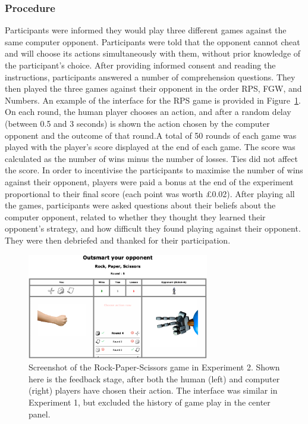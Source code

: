 \documentclass[
  english,
  man,floatsintext]{apa6}
\begin{document}
\hypertarget{procedure}{%
\subsubsection{Procedure}\label{procedure}}

Participants were informed they would play three different games against the same computer opponent. Participants were told that the opponent cannot cheat and will choose its actions simultaneously with them, without prior knowledge of the participant's choice. After providing informed consent and reading the instructions, participants answered a number of comprehension questions. They then played the three games against their opponent in the order RPS, FGW, and Numbers. An example of the interface for the RPS game is provided in Figure~\ref{fig:feedback-rps-exp2}. On each round, the human player chooses an action, and after a random delay (between 0.5 and 3 seconds) is shown the action chosen by the computer opponent and the outcome of that round.A total of 50 rounds of each game was played with the player's score displayed at the end of each game. The score was calculated as the number of wins minus the number of losses. Ties did not affect the score. In order to incentivise the participants to maximise the number of wins against their opponent, players were paid a bonus at the end of the experiment proportional to their final score (each point was worth £0.02). After playing all the games, participants were asked questions about their beliefs about the computer opponent, related to whether they thought they learned their opponent's strategy, and how difficult they found playing against their opponent. They were then debriefed and thanked for their participation.

\begin{figure}

{\centering \includegraphics[width=3.13in]{images/feedback_rps} 

}

\caption{Screenshot of the Rock-Paper-Scissors game in Experiment 2. Shown here is the feedback stage, after both the human (left) and computer (right) players have chosen their action. The interface was similar in Experiment 1, but excluded the history of game play in the center panel.}\label{fig:feedback-rps-exp2}
\end{figure}
\end{document}
